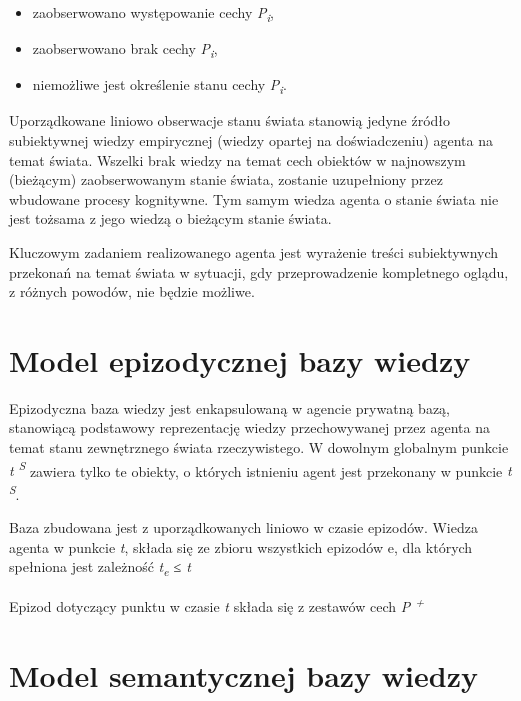 		\begin{itemize}
		 	\setlength{\itemindent}{.5in}
			\item zaobserwowano występowanie cechy \textit{P\textsubscript{i}},
			\item zaobserwowano brak cechy \textit{P\textsubscript{i}},
			\item niemożliwe jest określenie stanu cechy \textit{P\textsubscript{i}}.
		\end{itemize}
	
	Uporządkowane liniowo obserwacje stanu świata stanowią jedyne źródło subiektywnej wiedzy empirycznej (wiedzy opartej na doświadczeniu) agenta na temat świata. Wszelki brak wiedzy na temat cech obiektów w najnowszym (bieżącym) zaobserwowanym stanie świata, zostanie uzupełniony przez wbudowane procesy kognitywne. Tym samym wiedza agenta o stanie świata nie jest tożsama z jego wiedzą o bieżącym stanie świata.
	
	Kluczowym zadaniem realizowanego agenta jest wyrażenie treści subiektywnych przekonań na temat świata w sytuacji, gdy przeprowadzenie kompletnego oglądu, z różnych powodów, nie będzie możliwe.
	

\section{Model epizodycznej bazy wiedzy}

Epizodyczna baza wiedzy jest enkapsulowaną w agencie prywatną bazą, stanowiącą podstawowy reprezentację wiedzy przechowywanej przez agenta na temat stanu zewnętrznego świata rzeczywistego. W dowolnym globalnym punkcie 
\textit{t\textsuperscript{ S}} 
zawiera tylko te obiekty, o których istnieniu agent jest przekonany w punkcie 
\textit{t\textsuperscript{ S}}.

Baza zbudowana jest z uporządkowanych liniowo w czasie epizodów. Wiedza agenta w punkcie \textit{t}, składa się ze zbioru wszystkich epizodów e, dla których spełniona jest zależność \textit{t\textsubscript{e} ≤ t}

Epizod dotyczący punktu w czasie \textit{t} składa się z zestawów cech \textit{P\textsuperscript{ +}}


\section{Model semantycznej bazy wiedzy}




